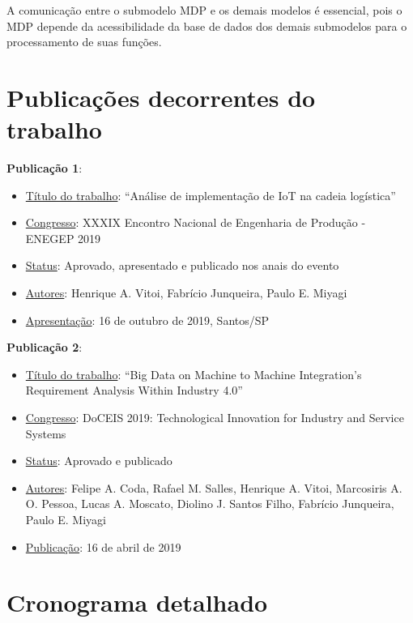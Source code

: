 \documentclass[
	12pt,				%
	oneside,			%
	a4paper,			%
	english,			%
	brazil				%
]{abntex2}
\begin{document}
	A comunicação entre o submodelo MDP e os demais modelos é essencial, pois o MDP depende da acessibilidade da base de dados dos demais submodelos para o processamento de suas funções. 
	
	

\chapter{Publicações decorrentes do trabalho}

	\textbf{Publicação 1}:
	\begin{itemize}
		\item \underline{Título do trabalho}: “Análise de implementação de IoT na cadeia logística”
		\item \underline{Congresso}: XXXIX Encontro Nacional de Engenharia de Produção - ENEGEP 2019
		\item \underline{Status}: Aprovado, apresentado e publicado nos anais do evento
		\item \underline{Autores}:  Henrique A. Vitoi, Fabrício Junqueira, Paulo E. Miyagi
		\item \underline{Apresentação}: 16 de outubro de 2019, Santos/SP
	\end{itemize}
	
	\bigskip
	

	\textbf{Publicação 2}:
	\begin{itemize}
		\item \underline{Título do trabalho}: “Big Data on Machine to Machine Integration's Requirement Analysis Within Industry 4.0”
		\item \underline{Congresso}: DoCEIS 2019: Technological Innovation for Industry and Service Systems
		\item \underline{Status}: Aprovado e publicado
		\item \underline{Autores}:  Felipe A. Coda, Rafael M. Salles, Henrique A. Vitoi, Marcosiris A. O. Pessoa, Lucas A. Moscato, Diolino J. Santos Filho, Fabrício Junqueira, Paulo E. Miyagi
		\item \underline{Publicação}: 16 de abril de 2019
	\end{itemize}




\chapter{Cronograma detalhado}
\end{document}
